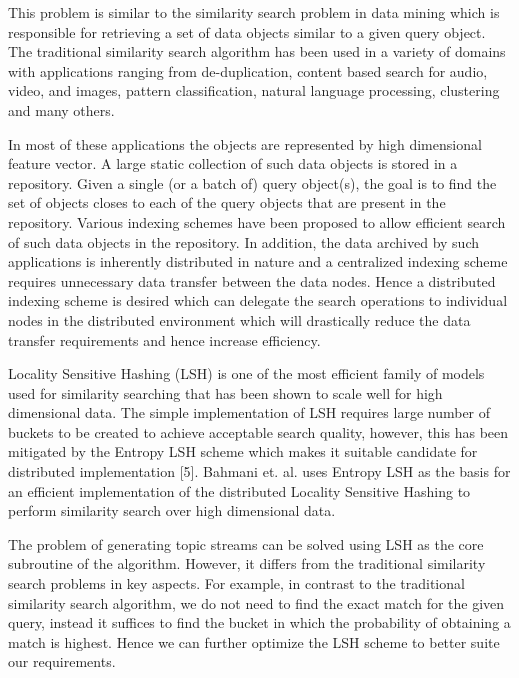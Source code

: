 \documentclass{article} %
\begin{document}
This problem is similar to the similarity search problem in data mining which is responsible for retrieving a set of data objects similar to a given query object. The traditional similarity search algorithm has been used in a variety of domains with applications ranging from de-duplication, content based search for audio, video, and images, pattern classification, natural language processing, clustering and many others. 

In most of these applications the objects are represented by high dimensional feature vector. A large static collection of such data objects is stored in a repository. Given a single (or a batch of) query object(s), the goal is to find the set of objects closes to each of the query objects that are present in the repository. Various indexing schemes have been proposed to allow efficient search of such data objects in the repository. In addition, the data archived by such applications is inherently distributed in nature and a centralized indexing scheme requires unnecessary data transfer between the data nodes. Hence a distributed indexing scheme is desired which can delegate the search operations to individual nodes in the distributed environment which will drastically reduce the data transfer requirements and hence increase efficiency.

Locality Sensitive Hashing (LSH) is one of the most efficient family of models used for similarity searching that has been shown to scale well for high dimensional data. The simple implementation of LSH requires large number of buckets to be created to achieve acceptable search quality, however, this has been mitigated by the Entropy LSH scheme which makes it suitable candidate for distributed implementation [5]. Bahmani et. al. uses Entropy LSH as the basis for an efficient implementation of the distributed Locality Sensitive Hashing to perform similarity search over high dimensional data.

The problem of generating topic streams can be solved using LSH as the core subroutine of the algorithm. However, it differs from the traditional similarity search problems in key aspects. For example, in contrast to the traditional similarity search algorithm, we do not need to find the exact match for the given query, instead it suffices to find the bucket in which the probability of obtaining a match is highest. Hence we can further optimize the LSH scheme to better suite our requirements.
\end{document}
